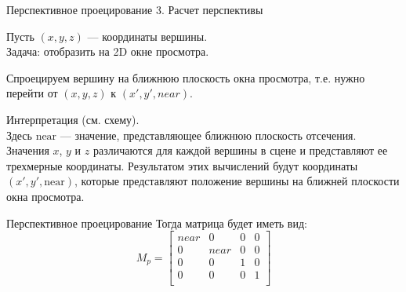 \documentclass{beamer}
\begin{document}
	\begin{frame}{Перспективное проецирование}
		3. Расчет перспективы

		\vspace{0.5cm}

		Пусть $(x, y, z)$ --- координаты вершины. \\ 
		Задача: отобразить на 2D окне просмотра.

		\vspace{0.5cm}

    Спроецируем вершину на ближнюю плоскость окна просмотра, т.е. нужно перейти от $(x,y,z)$ к $(x',y',near)$. \\
		
		\vspace{0.5cm}

		Интерпретация (см. схему). \\
    Здесь $\text{near}$ --- значение, представляющее ближнюю плоскость отсечения. Значения $x$, $y$ и $z$ различаются для каждой вершины в сцене и представляют ее трехмерные координаты. Результатом этих вычислений будут координаты $(x', y', \text{near})$, которые представляют положение вершины на ближней плоскости окна просмотра.



	\end{frame}

	\begin{frame}{Перспективное проецирование}
		Тогда матрица будет иметь вид:
 \[
	M_p = 
	 \begin{bmatrix}
		near & 0 & 0 & 0 \\
		0 & near & 0 & 0 \\
		0 & 0 & 1 & 0 \\
		0 & 0 & 0 & 1 \\
	\end{bmatrix}	
	\]

	\end{frame}
\end{document}
